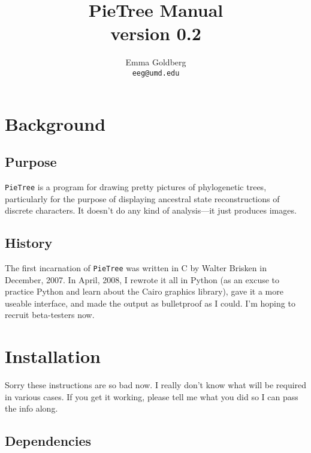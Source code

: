 \documentclass[10pt]{article}
\newcommand{\PT}{\texttt{PieTree}\xspace}
\begin{document}
\title{
	\vspace{-20pt}
	\Large{ {\bf PieTree} Manual} \\
	\large{ version 0.2 } 
}
\author{
	\large{Emma Goldberg} \\
	\large{\texttt{eeg@umd.edu}} 
}
\maketitle


\tableofcontents


\section*{Background}

\subsection*{Purpose}

\PT is a program for drawing pretty pictures of phylogenetic trees, particularly for the purpose of displaying ancestral state reconstructions of discrete characters.
It doesn't do any kind of analysis---it just produces images.

\subsection*{History}

The first incarnation of \PT was written in C by Walter Brisken in December, 2007.
In April, 2008, I rewrote it all in Python (as an excuse to practice Python and learn about the Cairo graphics library), gave it a more useable interface, and made the output as bulletproof as I could.
I'm hoping to recruit beta-testers now.


\section*{Installation}

Sorry these instructions are so bad now. 
I really don't know what will be required in various cases.
If you get it working, please tell me what you did so I can pass the info along.

\subsection*{Dependencies}
\end{document}
